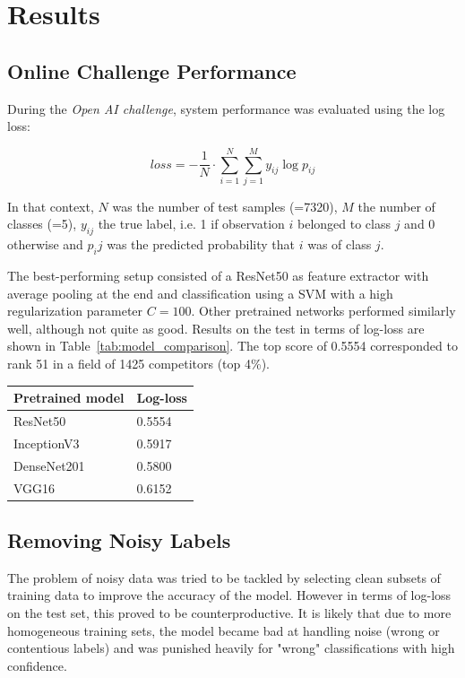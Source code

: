 \documentclass[11pt]{article}
\begin{document}
	\section{Results}
	
	\subsection{Online Challenge Performance}
	
	During the \textit{Open AI challenge}, system performance was evaluated using the log loss:
	
	\begin{equation}
		loss = -\frac{1}{N}\cdot \sum_{i=1}^{N} \sum_{j=1}^{M}y_{ij}\log p_{ij}
	\end{equation}
	
	In that context, $N$ was the number of test samples (=7320), $M$ the number of classes (=5), $y_{ij}$ the true label, i.e. 1 if observation $i$ belonged to class $j$ and 0 otherwise and $p_ij$ was the predicted probability that $i$ was of class $j$. 
	
	The best-performing setup consisted of a ResNet50 as feature extractor with average pooling at the end and classification using a SVM with a high regularization parameter $C=100$.
	Other pretrained networks performed similarly well, although not quite as good. Results on the test in terms of log-loss are shown in Table~\ref{tab:model_comparison}.
	The top score of 0.5554 corresponded to rank 51 in a field of 1425 competitors (top 4\%).
	
	\begin{center}
		\bgroup
		\def\arraystretch{1.1}
		\begin{tabular}{ | m{4cm} | m{2cm} | } 
			
			\hline
			Pretrained model & Log-loss \\
			\hline
			\hline
			ResNet50 & 0.5554 \\
			\hline
			InceptionV3 & 0.5917\\
			\hline
			DenseNet201 & 0.5800\\
			\hline
			VGG16 & 0.6152\\
			\hline
		\end{tabular}
		\egroup
		\label{tab:model_comparison}
	\end{center}

	
	\subsection{Removing Noisy Labels}
	The problem of noisy data was tried to be tackled by selecting clean subsets of training data to improve the accuracy of the model. However in terms of log-loss on the test set, this proved to be counterproductive. It is likely that due to more homogeneous training sets, the model became bad at handling noise (wrong or contentious labels) and was punished heavily for "wrong" classifications with high confidence.
	
\end{document}
